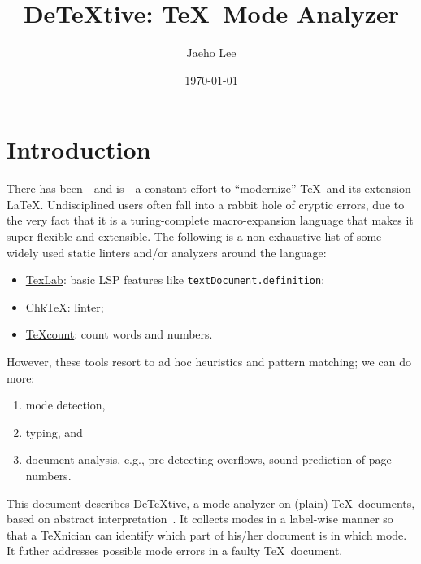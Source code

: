 \documentclass[a4paper]{article}
\title{De\TeX{}tive: \TeX\ Mode Analyzer}
\author{Jaeho Lee}
\date{\today}
\begin{document}
\maketitle

\begin{center}
\end{center}

\tableofcontents

\section{Introduction}
There has been---and is---a constant effort to ``modernize'' \TeX\ and its extension \LaTeX.
Undisciplined users often fall into a rabbit hole of cryptic errors, due to the very fact that it is a turing-complete macro-expansion language that makes it super flexible and extensible.
The following is a non-exhaustive list of some widely used static linters and/or analyzers around the language:
\begin{itemize}
\item \href{https://github.com/latex-lsp/texlab}{TexLab}: basic LSP features like \verb/textDocument.definition/;
\item \href{https://www.nongnu.org/chktex/}{Chk\TeX}: linter;
\item \href{https://app.uio.no/ifi/texcount/}{\TeX{}count}: count words and numbers.
\end{itemize}
However, these tools resort to ad hoc heuristics and pattern matching; we can do more:
\begin{enumerate}
\item mode detection,
\item typing, and
\item document analysis, e.g., pre-detecting overflows, sound prediction of page numbers.
\end{enumerate}

This document describes De\TeX{}tive, a mode analyzer on (plain) \TeX\ documents, based on abstract interpretation~\cite{itsa}.
It collects modes in a label-wise manner so that a \TeX{}nician can identify which part of his/her document is in which mode.
It futher addresses possible mode errors in a faulty \TeX\ document.
\end{document}
